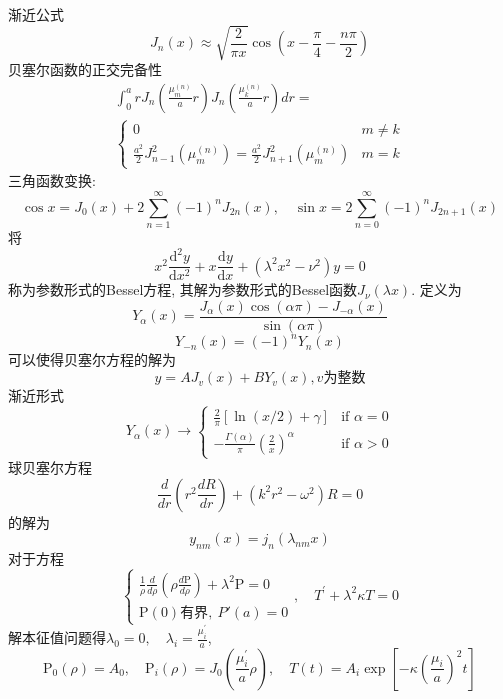 \documentclass[UTF8,8pt]{ctexart}
\begin{document}
\begin{multicols}{2}
$$    $$
    渐近公式$$ 
    J_{n}(x) \approx \sqrt{\frac{2}{\pi x}} \cos \left(x-\frac{\pi}{4}-\frac{n \pi}{2}\right)
    $$贝塞尔函数的正交完备性
    $$ \begin{array}{lr}
    \int_{0}^{a} r J_{n}\left(\frac{\mu_{m}^{(n)}}{a} r\right) J_{n}\left(\frac{\mu_{k}^{(n)}}{a} r\right) d r=\\
    \left\{\begin{array}{lr}
    {0} & {m \neq k} \\ 
    {\frac{a^{2}}{2} J_{n-1}^{2}\left(\mu_{m}^{(n)}\right)=\frac{a^{2}}{2} J_{n+1}^{2}\left(\mu_{m}^{(n)}\right)} & {m=k}\end{array}\right.
    \end{array}$$
    三角函数变换:
    $$ 
    \cos x=J_{0}(x)+2 \sum_{n=1}^{\infty}(-1)^{n} J_{2 n}(x), \quad \sin x=2 \sum_{n=0}^{\infty}(-1)^{n} J_{2 n+1}(x)
    $$
    将$$ 
    x^{2} \frac{\mathrm{d}^{2} y}{\mathrm{d} x^{2}}+x \frac{\mathrm{d} y}{\mathrm{d} x}+\left(\lambda^{2} x^{2}-\nu^{2}\right) y=0
    $$
    称为参数形式的Bessel方程, 其解为参数形式的Bessel函数$J_{\nu}(\lambda x)$.
    定义为$$ 
    Y_{\alpha}(x)=\frac{J_{\alpha}(x) \cos (\alpha \pi)-J_{-\alpha}(x)}{\sin (\alpha \pi)}
    $$
    $$ 
    Y_{-n}(x)=(-1)^{n} Y_{n}(x)
    $$
    可以使得贝塞尔方程的解为
    $$ 
    y=A J_{v}(x)+B Y_{v}(x), v\text{为整数}
    $$
    渐近形式
    $$Y_{\alpha }(x)\rightarrow \left\{{\begin{matrix}{\frac {2}{\pi }}\left[\ln(x/2)+\gamma \right]&{\mbox{if }}\alpha =0\\-{\frac {\Gamma (\alpha )}{\pi }}\left({\frac {2}{x}}\right)^{\alpha }&{\mbox{if }}\alpha >0\end{matrix}}\right.$$
    球贝塞尔方程$$ 
    \frac{d}{d r}\left(r^{2} \frac{d R}{d r}\right)+\left(k^{2} r^{2}-\omega^{2}\right) R=0
    $$的解为$$ 
    y_{n m}(x)=j_{n}\left(\lambda_{n m} x\right)
    $$
    对于方程$$ 
    \left\{\begin{array}{l}{\frac{1}{\rho} \frac{d}{d \rho}\left(\rho \frac{d \mathrm{P}}{d \rho}\right)+\lambda^{2} \mathrm{P}=0} \\ {\mathrm{P}(0)\text{有界},\ P'(a)=0}\end{array}\right.,\quad T^{\prime}+\lambda^{2} \kappa T=0
    $$
    解本征值问题得$\lambda_{0}=0, \quad \lambda_{i}=\frac{\mu_{i}^{\prime}}{a}$,
    $$ 
    \mathrm{P}_{0}(\rho)=A_{0}, \quad \mathrm{P}_{i}(\rho)=J_{0}\left(\frac{\mu_{i}^{\prime}}{a} \rho\right),\quad T(t)=A_{i} \exp \left[-\kappa\left(\frac{\mu_{i}}{a}\right)^{2} t\right]
$$
\end{multicols}
\end{document}
